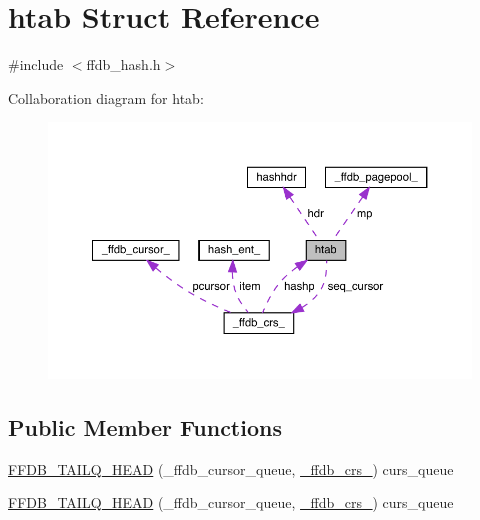 \hypertarget{structhtab}{}\section{htab Struct Reference}
\label{structhtab}


{\ttfamily \#include $<$ffdb\+\_\+hash.\+h$>$}



Collaboration diagram for htab\+:\nopagebreak
\begin{figure}[H]
\begin{center}
\leavevmode
\includegraphics[width=350pt]{de/d56/structhtab__coll__graph}
\end{center}
\end{figure}
\subsection*{Public Member Functions}
\begin{DoxyCompactItemize}
\item 
\mbox{\hyperlink{structhtab_af19d4f4f4be39bcc1bca0509bef5c3cf}{F\+F\+D\+B\+\_\+\+T\+A\+I\+L\+Q\+\_\+\+H\+E\+AD}} (\+\_\+ffdb\+\_\+cursor\+\_\+queue, \mbox{\hyperlink{struct__ffdb__crs__}{\+\_\+ffdb\+\_\+crs\+\_\+}}) curs\+\_\+queue
\item 
\mbox{\hyperlink{structhtab_af19d4f4f4be39bcc1bca0509bef5c3cf}{F\+F\+D\+B\+\_\+\+T\+A\+I\+L\+Q\+\_\+\+H\+E\+AD}} (\+\_\+ffdb\+\_\+cursor\+\_\+queue, \mbox{\hyperlink{struct__ffdb__crs__}{\+\_\+ffdb\+\_\+crs\+\_\+}}) curs\+\_\+queue
\end{DoxyCompactItemize}
